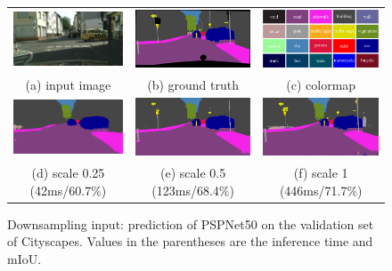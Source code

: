\documentclass[runningheads]{llncs}
\begin{document}
\begin{figure}[bpt]
	\centering
	\begin{tabular}{ccc}
		\includegraphics[width=0.32\linewidth]{images/val0-image.pdf}&
		\includegraphics[width=0.32\linewidth]{images/val0-gt.pdf}&
		\includegraphics[width=0.32\linewidth]{images/color.pdf}\\
		{\scriptsize (a) input image} & {\scriptsize (b) ground truth} & {\scriptsize (c) colormap}\\
		\includegraphics[width=0.32\linewidth]{images/val0-025.pdf}&
		\includegraphics[width=0.32\linewidth]{images/val0-05.pdf}&
		\includegraphics[width=0.32\linewidth]{images/val0-1.pdf}\\
		{\scriptsize (d) scale 0.25 (42ms/60.7\%)} & {\scriptsize (e) scale 0.5 (123ms/68.4\%)} & {\scriptsize (f) scale 1 (446ms/71.7\%)}\\
	\end{tabular}
	\caption{Downsampling input: prediction of PSPNet50 on the validation set of Cityscapes. Values in the parentheses are the inference time and mIoU.}
	\label{fig:resolutionprediction}
\end{figure}
\end{document}
